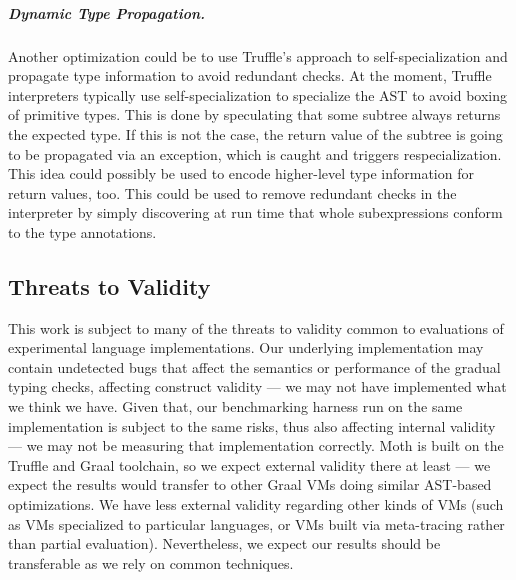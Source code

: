 
\subparagraph{Dynamic Type Propagation.}
Another optimization could be to use Truffle's approach to 
self-specialization\citep{Wurthinger:2012:SelfOptAST}
and propagate type information to avoid redundant checks.
At the moment, Truffle interpreters typically use self-specialization to 
specialize the AST to avoid boxing of primitive types.
This is done by speculating that some subtree always returns the expected type.
If this is not the case, the return value of the subtree is going to be
propagated via an exception, which is caught and triggers respecialization.
This idea could possibly be used to encode higher-level type information for
return values, too.
This could be used to remove redundant checks in the interpreter
by simply discovering at run time that whole subexpressions conform to the
type annotations.

\subsection{Threats to Validity}


This work is subject to many of the threats to validity common to
evaluations of experimental language implementations.  Our underlying
implementation may contain undetected bugs that affect the semantics
or performance of the gradual typing checks, affecting construct
validity --- we may not have implemented what we think we have. Given
that, our benchmarking harness run on the same implementation is
subject to the same risks, thus also affecting internal validity ---
we may not be measuring that implementation correctly.  Moth is built
on the Truffle and Graal toolchain, so we expect external validity
there at least --- we expect the results would transfer to other Graal
VMs doing similar AST-based optimizations.  We have less external
validity regarding other kinds of VMs (such as VMs specialized to 
particular languages, or VMs built via meta-tracing rather than partial evaluation). 
Nevertheless, we expect our results should be transferable
as we rely on common techniques.

